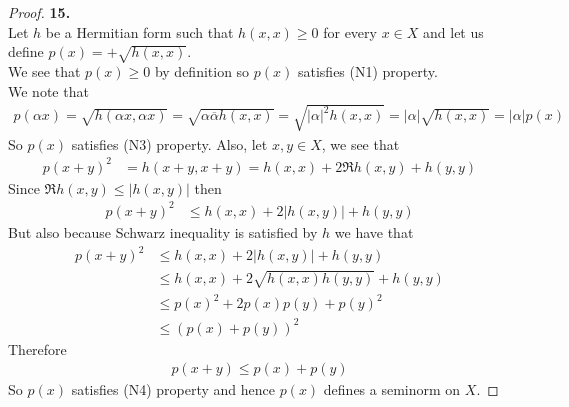\documentclass[11pt]{article}
\theoremstyle{definition}
\begin{document}
\cleardoublepage
\begin{proof}{\textbf{15.}}\\
Let $h$ be a Hermitian form such that $h(x,x) \geq 0$ for every $x \in X$ and
let us define $p(x) = +\sqrt{h(x,x)}$.\\
We see that $p(x) \geq 0$ by definition so $p(x)$ satisfies (N1) property.\\
We note that
\begin{align*}
    p(\alpha x) = \sqrt{h(\alpha x, \alpha x)}
    = \sqrt{\alpha \overline{\alpha}h(x, x)} 
    = \sqrt{|\alpha|^2 h(x, x)} 
    = |\alpha|\sqrt{ h(x, x)} = |\alpha|p(x)
\end{align*}
So $p(x)$ satisfies (N3) property. Also, let $x,y \in X$, we see that
\begin{align*}
    p(x + y)^2 &= h(x + y, x + y)
    = h(x,x) + 2\Re{h(x,y)} + h(y,y)
\end{align*}
Since $\Re{h(x,y)} \leq |h(x,y)|$ then
\begin{align*}
    p(x + y)^2
    &\leq h(x,x) + 2|h(x,y)| + h(y,y)
\end{align*}
But also because Schwarz inequality is satisfied by $h$ we have that
\begin{align*}
    p(x + y)^2
    &\leq h(x,x) + 2|h(x,y)| + h(y,y) \\
    &\leq h(x,x) + 2\sqrt{h(x,x)h(y,y)} + h(y,y) \\
    &\leq p(x)^2 + 2p(x)p(y) + p(y)^2 \\
    &\leq (p(x) + p(y))^2
\end{align*}
Therefore
\begin{align*}
    p(x + y) \leq p(x) + p(y)
\end{align*}
So $p(x)$ satisfies (N4) property and hence $p(x)$ defines a seminorm on $X$.
\end{proof}
\end{document}
